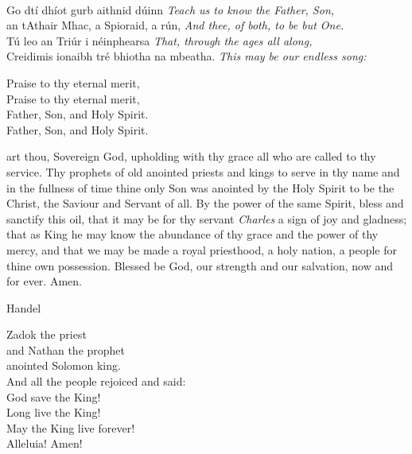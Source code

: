 {\\
Go dtí dhíot gurb aithnid dúinn
\hfill\textit{Teach us to know the Father, Son,}\\an tAthair Mhac, a Spioraid, a rún,
\hfill\textit{And thee, of both, to be but One.}\\
Tú leo an Triúr i néinphearsa
\hfill\textit{That, through the ages all along,}\\
Creidimis ionaibh tré bhiotha na mbeatha.
\hfill\textit{This may be our endless song:}
\begin{center}
	Praise to thy eternal merit,\\
Praise to thy eternal merit,\\
Father, Son, and Holy Spirit.\\
Father, Son, and Holy Spirit.

\end{center}









 art thou, Sovereign God,
upholding with thy grace all who are called to thy service.
Thy prophets of old anointed priests and kings to serve in thy name
and in the fullness of time thine only Son was anointed by the Holy Spirit
to be the Christ, the Saviour and Servant of all.
By the power of the same Spirit,
bless and sanctify this oil,
that it may be for thy servant \textit{Charles}
a sign of joy and gladness;
that as King he may know the abundance of thy grace
and the power of thy mercy,
and that we may be made a royal priesthood, a holy nation,
a people for thine own possession.
Blessed be God, our strength and our salvation,
now and for ever.
Amen.
\vfill 
{}



 {Handel}{}


\begin{center}
	
Zadok the priest\\
and Nathan the prophet\\
anointed Solomon king.\\
And all the people rejoiced and said:\\
God save the King!\\
Long live the King!\\
May the King live forever!\\
Alleluia! Amen!
\end{center}

}
